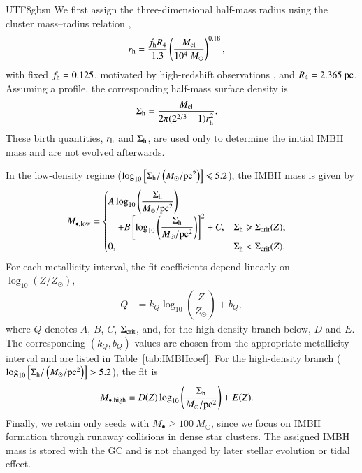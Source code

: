\documentclass[trackchanges, twocolappendix, twocolumn]{aastex701}
\begin{document}
\begin{CJK*}{UTF8}{gbsn}
We first assign the three-dimensional half-mass radius using the cluster mass--radius relation \citep{Marks&Kroupa2012MRRofSCs, Brown&Gnedin2021MRRofSCs},
\begin{align}
r_{\rm h} & = \dfrac{f_{\rm h} R_4}{1.3}
\left( \dfrac{M_{\rm cl}}{10^4~M_\odot} \right)^{0.18},
\label{eq:imbh_radius}
\end{align}
with fixed $f_{\rm h} = 0.125$, motivated by high-redshift observations \citep{Adamo+2024MRRofSCs}, and $R_4 = 2.365~{\rm pc}$. Assuming a \cite{Plummer1911MRRofSCs} profile, the corresponding half-mass surface density is
\begin{align}
\Sigma_{\rm h} & = \dfrac{M_{\rm cl}}{2 \pi (2^{2/3} - 1) r_{\rm h}^2} .
\label{eq:Sigma_h}
\end{align}
These birth quantities, $r_{\rm h}$ and $\Sigma_{\rm h}$, are used only to determine the initial IMBH mass and are not evolved afterwards.

In the low-density regime ($\log_{10} \left[ \Sigma_{\rm h} / \left( M_\odot / {\rm pc}^2 \right) \right] \leqslant 5.2$), the IMBH mass is given by
\begin{align}
M_{\bullet, \rm low} & = \begin{cases}
A \log_{10} \left( \dfrac{\Sigma_{\rm h}}{M_\odot / {\rm pc}^2} \right) \\
\quad + B \left[ \log_{10} \left( \dfrac{\Sigma_{\rm h}} {M_\odot / {\rm pc}^2} \right) \right]^2 + C , & \Sigma_{\rm h} \geqslant \Sigma_{\rm crit} (Z) ; \\
0 , & \Sigma_{\rm h} < \Sigma_{\rm crit} (Z) .
\end{cases}
\label{eq:IMBHlow}
\end{align}
For each metallicity interval, the fit coefficients depend linearly on $\log_{10} \left( Z / Z_\odot \right)$,
\begin{align}
Q & = k_Q \log_{10} \left( \dfrac{Z}{Z_\odot} \right) + b_Q ,
\end{align}
where $Q$ denotes $A$, $B$, $C$, $\Sigma_{\rm crit}$, and, for the high-density branch below, $D$ and $E$. The corresponding $(k_Q, b_Q)$ values are chosen from the appropriate metallicity interval and are listed in Table~\ref{tab:IMBHcoef}. For the high-density branch ($\log_{10} \left[ \Sigma_{\rm h} / \left( M_\odot / {\rm pc}^2 \right) \right] > 5.2$), the fit is
\begin{align}
M_{\bullet, \rm high} & = D (Z) \log_{10} \left( \dfrac{\Sigma_{\rm h}}{M_\odot / {\rm pc}^2} \right) + E (Z) .
\label{eq:IMBHhigh}
\end{align}
Finally, we retain only seeds with $M_\bullet \geqslant 100~M_\odot$, since we focus on IMBH formation through runaway collisions in dense star clusters. The assigned IMBH mass is stored with the GC and is not changed by later stellar evolution or tidal effect.


\end{CJK*}
\end{document}

